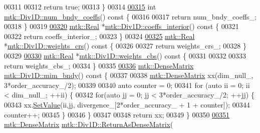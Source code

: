 \begin{DoxyCode}
{{00311 
00312   \textcolor{keywordflow}{return} \textcolor{keyword}{true};
00313 \}
00314 
\hypertarget{mtk__div__1d_8cc_source_l00315}{}\hyperlink{classmtk_1_1Div1D_a975cb2a91ed6806f6fc0a3a5b01b01b1}{00315} \textcolor{keywordtype}{int} \hyperlink{classmtk_1_1Div1D_a975cb2a91ed6806f6fc0a3a5b01b01b1}{mtk::Div1D::num\_bndy\_coeffs}()\textcolor{keyword}{ const }\{
00316 
00317   \textcolor{keywordflow}{return} num\_bndy\_coeffs\_;
00318 \}
00319 
\hypertarget{mtk__div__1d_8cc_source_l00320}{}\hyperlink{classmtk_1_1Div1D_a0916b5e84b019b4b6a33d0a45d829513}{00320} \hyperlink{group__c01-roots_gac080bbbf5cbb5502c9f00405f894857d}{mtk::Real} *\hyperlink{classmtk_1_1Div1D_a0916b5e84b019b4b6a33d0a45d829513}{mtk::Div1D::coeffs\_interior}()\textcolor{keyword}{ const }\{
00321 
00322   \textcolor{keywordflow}{return} coeffs\_interior\_;
00323 \}
00324 
\hypertarget{mtk__div__1d_8cc_source_l00325}{}\hyperlink{classmtk_1_1Div1D_ab5c791285e7e51a85b8c62a1b0ab9126}{00325} \hyperlink{group__c01-roots_gac080bbbf5cbb5502c9f00405f894857d}{mtk::Real} *\hyperlink{classmtk_1_1Div1D_ab5c791285e7e51a85b8c62a1b0ab9126}{mtk::Div1D::weights\_crs}()\textcolor{keyword}{ const }\{
00326 
00327   \textcolor{keywordflow}{return} weights\_crs\_;
00328 \}
00329 
\hypertarget{mtk__div__1d_8cc_source_l00330}{}\hyperlink{classmtk_1_1Div1D_a5d4fe8c61ce41cb1134a3f9cb16deb59}{00330} \hyperlink{group__c01-roots_gac080bbbf5cbb5502c9f00405f894857d}{mtk::Real} *\hyperlink{classmtk_1_1Div1D_a5d4fe8c61ce41cb1134a3f9cb16deb59}{mtk::Div1D::weights\_cbs}()\textcolor{keyword}{ const }\{
00331 
00332 
00333   \textcolor{keywordflow}{return} weights\_cbs\_;
00334 \}
00335 
\hypertarget{mtk__div__1d_8cc_source_l00336}{}\hyperlink{classmtk_1_1Div1D_a2c844ef39825e73e4024d35fcdd42b12}{00336} \hyperlink{classmtk_1_1DenseMatrix}{mtk::DenseMatrix} \hyperlink{classmtk_1_1Div1D_a2c844ef39825e73e4024d35fcdd42b12}{mtk::Div1D::mim\_bndy}()\textcolor{keyword}{ const }\{
00337 
00338   \hyperlink{classmtk_1_1DenseMatrix}{mtk::DenseMatrix} xx(dim\_null\_, 3*order\_accuracy\_/2);
00339 
00340   \textcolor{keyword}{auto} counter = 0;
00341   \textcolor{keywordflow}{for} (\textcolor{keyword}{auto} ii = 0; ii < dim\_null\_; ++ii) \{
00342     \textcolor{keywordflow}{for}(\textcolor{keyword}{auto} jj = 0; jj < 3*order\_accuracy\_/2; ++jj) \{
00343       xx.\hyperlink{classmtk_1_1DenseMatrix_ae0f873a6d3a734da467cafb817da64ae}{SetValue}(ii,jj, divergence\_[2*order\_accuracy\_ + 1 + counter]);
00344       counter++;
00345     \}
00346   \}
00347 
00348   \textcolor{keywordflow}{return} xx;
00349 \}
00350 
\hypertarget{mtk__div__1d_8cc_source_l00351}{}\hyperlink{classmtk_1_1Div1D_a213fddbaaf86e4840c6a9649b69c2d49}{00351} \hyperlink{classmtk_1_1DenseMatrix}{mtk::DenseMatrix} \hyperlink{classmtk_1_1Div1D_a213fddbaaf86e4840c6a9649b69c2d49}{mtk::Div1D::ReturnAsDenseMatrix}(
}}
\end{DoxyCode}
